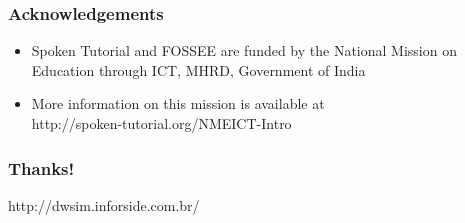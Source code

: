 \documentclass[17pt,xcolor=table]{beamer}
\begin{document}
\begin{frame}
\frametitle{Acknowledgements}
\begin{itemize}
\item Spoken Tutorial and FOSSEE are funded by the National Mission on
  Education through ICT, MHRD, Government of India
\item More information on this mission is available at \\
\hspace{0.25in}
{\small \color{blue}http://spoken-tutorial.org/NMEICT-Intro}
\end{itemize}
\end{frame}

\begin{frame}
\frametitle{Thanks!}
\begin{center}
http://dwsim.inforside.com.br/
\end{center}
\end{frame}
\end{document}
